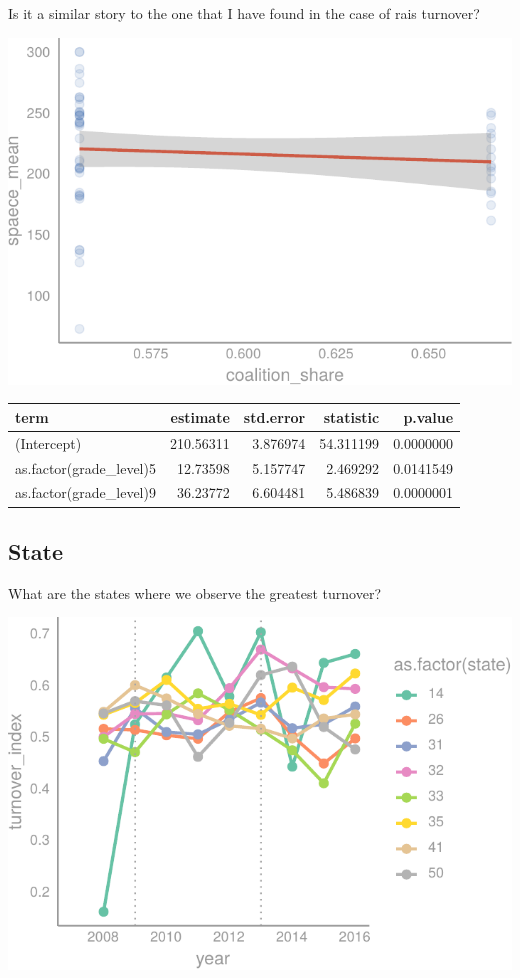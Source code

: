\documentclass[12pt,]{article}
\begin{document}
Is it a similar story to the one that I have found in the case of rais
turnover?

\begin{center}\includegraphics{dissertation_files/figure-latex/unnamed-chunk-37-1} \end{center}

\begin{tabular}{l|r|r|r|r}
\hline
term & estimate & std.error & statistic & p.value\\
\hline
(Intercept) & 210.56311 & 3.876974 & 54.311199 & 0.0000000\\
\hline
as.factor(grade\_level)5 & 12.73598 & 5.157747 & 2.469292 & 0.0141549\\
\hline
as.factor(grade\_level)9 & 36.23772 & 6.604481 & 5.486839 & 0.0000001\\
\hline
\end{tabular}

\hypertarget{state}{%
\subsection{State}\label{state}}

What are the states where we observe the greatest turnover?

\begin{center}\includegraphics{dissertation_files/figure-latex/unnamed-chunk-38-1} \end{center}
\end{document}

